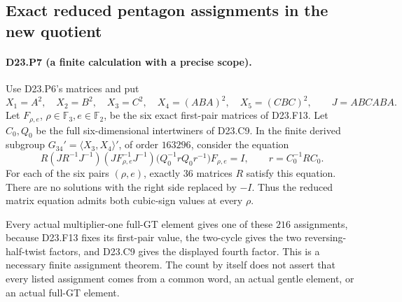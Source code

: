 \subsection{Exact reduced pentagon assignments in the new quotient}

\paragraph{D23.P7 (a finite calculation with a precise scope).}
Use D23.P6's matrices and put
\[
 X_1=A^2,\quad X_2=B^2,\quad X_3=C^2,\quad
 X_4=(ABA)^2,\quad X_5=(CBC)^2,\qquad J=ABCABA.
\]
Let $F_{\rho,e}$, $\rho\in\mathbb F_3,e\in\mathbb F_2$, be
the six exact first-pair matrices of D23.F13. Let $C_0,Q_0$ be
the full six-dimensional intertwiners of D23.C9. In the finite
derived subgroup $G_{34}'=\langle X_3,X_4\rangle'$, of order
$163296$, consider the equation
\[
 R(JR^{-1}J^{-1})(JF_{\rho,e}^{-1}J^{-1})
 \bigl(Q_0^{-1}rQ_0r^{-1}\bigr)F_{\rho,e}=I,
 \qquad r=C_0^{-1}RC_0.
\tag{D23.P7.1}
\]
For each of the six pairs $(\rho,e)$, exactly $36$ matrices $R$
satisfy this equation. There are no solutions with the right side
replaced by $-I$. Thus the reduced matrix equation admits both
cubic-sign values at every $\rho$.

Every actual multiplier-one full-GT element gives one of these
$216$ assignments, because D23.F13 fixes its first-pair value,
the two-cycle gives the two reversing-half-twist factors, and
D23.C9 gives the displayed fourth factor. This is a necessary
finite assignment theorem. The count by itself does not assert
that every listed assignment comes from a common word, an actual
gentle element, or an actual full-GT element.

